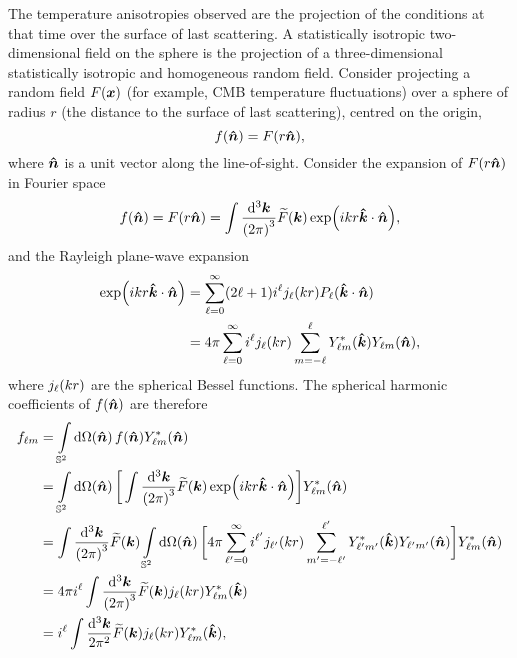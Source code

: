 The temperature anisotropies observed are the projection of the conditions at that time over the surface of last scattering.
A statistically isotropic two-dimensional field on the sphere is the projection of a three-dimensional statistically isotropic and homogeneous random field.
Consider projecting a random field \(F(\vb*{x})\) (for example, CMB temperature fluctuations) over a sphere of radius \(r\) (the distance to the surface of last scattering), centred on the origin, \ie{}
%
\begin{equation}
    f(\vu*{n})
    = F(r\vu*{n}),
\end{equation}
%
where \(\vu*{n}\) is a unit vector along the line-of-sight.
Consider the expansion of \(F(r\vu*{n})\) in Fourier space
%
\begin{equation}
    f(\vu*{n})
    = F(r\vu*{n})
    = \int\frac{\dd[3]{\vb*{k}}}{{(2\pi)}^{3}} \fourier{F}(\vb*{k}) \exp(i k r\vu*{k}\cdot\vu*{n}),
\end{equation}
%
and the Rayleigh plane-wave expansion
%
\begin{align}
    \exp(i k r\vu*{k}\cdot\vu*{n})
     & = \sum\limits_{\ell=0}^{\infty} (2\ell+1) i^{\ell} \bessel{k r} P_{\ell}(\vu*{k}\cdot\vu*{n}) \nonumber{}                                   \\
     & = 4\pi \sum\limits_{\ell=0}^{\infty} i^{\ell} \bessel{k r} \sum\limits_{m=-\ell}^{\ell} \conj{\harmonic{Y}}(\vu*{k}) \harmonic{Y}(\vu*{n}),
\end{align}
%
where \(\bessel{k r}\) are the spherical Bessel functions.
The spherical harmonic coefficients of \(f(\vu*{n})\) are therefore
%
\begin{align}
    \harmonic{f}
     & = \integrateSphere{\vu*{n}} f(\vu*{n}) \conj{\harmonic{Y}}(\vu*{n}) \nonumber{}                                                                                                                                                                                                                       \\
     & = \integrateSphere{\vu*{n}} \bigg[\int\frac{\dd[3]{\vb*{k}}}{{(2\pi)}^{3}} \fourier{F}(\vb*{k}) \exp(i k r\vu*{k}\cdot\vu*{n})\bigg] \conj{\harmonic{Y}}(\vu*{n}) \nonumber{}                                                                                                                         \\
     & = \int\frac{\dd[3]{\vb*{k}}}{{(2\pi)}^{3}} \fourier{F}(\vb*{k}) \integrateSphere{\vu*{n}} \bigg[4\pi \sum\limits_{\ell'=0}^{\infty} i^{\ell'} \bessel[']{k r} \sum\limits_{m'=-\ell'}^{\ell'} \conj{\harmonic[']{Y}}(\vu*{k}) \harmonic[']{Y}(\vu*{n})\bigg] \conj{\harmonic{Y}}(\vu*{n}) \nonumber{} \\
     & = 4\pi i^{\ell} \int\frac{\dd[3]{\vb*{k}}}{{(2\pi)}^{3}} \fourier{F}(\vb*{k}) \bessel{k r} \conj{\harmonic{Y}}(\vu*{k}) \nonumber{}                                                                                                                                                                   \\
     & = i^{\ell} \int\frac{\dd[3]{\vb*{k}}}{2\pi^{2}} \fourier{F}(\vb*{k}) \bessel{k r} \conj{\harmonic{Y}}(\vu*{k}),
\end{align}
